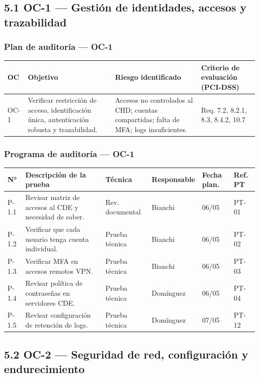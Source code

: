 \documentclass[11pt,a4paper]{article}
\begin{document}
\subsection{5.1 OC-1 — Gestión de identidades, accesos y trazabilidad}

\subsubsection{Plan de auditoría — OC-1}

\begin{tabularx}{\textwidth}{P{2.5cm}P{3cm}P{2.5cm}L}
\toprule
\textbf{OC} & \textbf{Objetivo} & \textbf{Riesgo identificado} & \textbf{Criterio de evaluación (PCI-DSS)} \\
\midrule
OC-1 & Verificar restricción de acceso, identificación única, autenticación robusta y trazabilidad. & Accesos no controlados al CHD; cuentas compartidas; falta de MFA; logs insuficientes. & Req. 7.2, 8.2.1, 8.3, 8.4.2, 10.7 \\
\bottomrule
\end{tabularx}

\subsubsection{Programa de auditoría — OC-1}

\begin{tabularx}{\textwidth}{P{1.8cm}P{2cm}P{3cm}P{2cm}P{1.5cm}L}
\toprule
\textbf{N°} & \textbf{Descripción de la prueba} & \textbf{Técnica} & \textbf{Responsable} & \textbf{Fecha plan.} & \textbf{Ref. PT} \\
\midrule
P-1.1 & Revisar matriz de accesos al CDE y necesidad de saber. & Rev. documental & Bianchi & 06/05 & PT-01 \\
P-1.2 & Verificar que cada usuario tenga cuenta individual. & Prueba técnica & Bianchi & 06/05 & PT-02 \\
P-1.3 & Verificar MFA en accesos remotos VPN. & Prueba técnica & Bianchi & 06/05 & PT-03 \\
P-1.4 & Revisar política de contraseñas en servidores CDE. & Prueba técnica & Domínguez & 06/05 & PT-04 \\
P-1.5 & Revisar configuración de retención de logs. & Prueba técnica & Domínguez & 07/05 & PT-12 \\
\bottomrule
\end{tabularx}

\subsection{5.2 OC-2 — Seguridad de red, configuración y endurecimiento}
\end{document}
